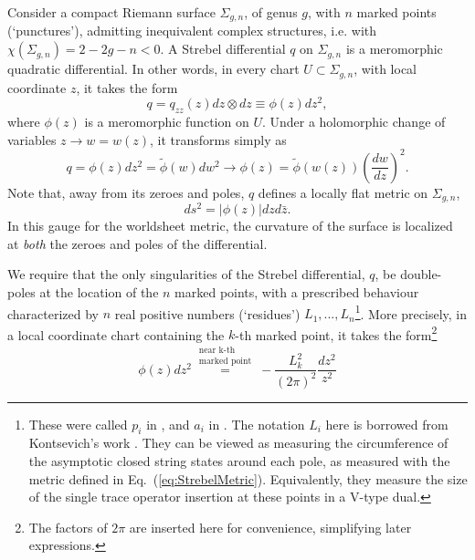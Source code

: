 \documentclass[english]{article}
\let\mc=\mathcal
\begin{document}
Consider a compact Riemann surface $\Sigma_{g,n}$, of genus $g$, with $n$ marked points (`punctures'), admitting inequivalent complex structures, i.e. with $\chi(\Sigma_{g,n})=2-2g-n<0$. 
A Strebel differential $q$ on $\Sigma_{g,n}$ is a meromorphic quadratic differential. In other words, in every chart $U \subset \Sigma_{g,n}$, with local coordinate $z$, it takes the form 
\begin{equation}
    q = q_{zz}(z) dz \otimes dz \equiv \phi(z) dz^2 ,
\end{equation}
where $\phi(z)$ is a meromorphic function on $U$. Under a holomorphic change of variables $z \rightarrow w=w(z)$, it transforms simply as 
\begin{equation}
    q = \phi(z) dz^2 = \tilde{\phi}(w) dw^2 \rightarrow  \phi(z) = \tilde{\phi}(w(z)) \left(\frac{dw}{dz} \right)^2 .
\end{equation}
Note that, away from its zeroes and poles, $q$ defines a locally flat metric on $\Sigma_{g,n}$,
\begin{equation} \label{eq:StrebelMetric}
    ds^2 = | \phi(z) | dz d\bar{z} .
\end{equation}
In this gauge for the worldsheet metric, the curvature of the surface is localized at \textit{both} the zeroes and poles of the  differential.  

We require that the only singularities of the Strebel differential, $q$, be double-poles at the location of the $n$  marked points, with a prescribed behaviour characterized by $n$ real positive numbers (`residues') $L_1,...,L_n$\footnote{These were called $p_i$ in \cite{freefieldsIII}, and $a_i$ in \cite{mulaseStrebel}. The notation $L_i$ here is borrowed from Kontsevich's work \cite{KontsevichAiry}. They can be viewed as measuring the circumference of the asymptotic closed string states around each pole, as measured with the metric defined in Eq.~(\ref{eq:StrebelMetric}). Equivalently, they measure the size of the single trace operator insertion at these points in a V-type dual.}. More precisely, in a local coordinate chart containing the $k$-th marked point, it takes the form\footnote{The factors of $2\pi$ are inserted here for convenience, simplifying later expressions. } 
\begin{equation}
    \phi(z) dz^2  \overset{\substack{\text{near k-th}\\ \text{marked point}}}{=} - \frac{L_k^2}{(2\pi)^2} \frac{dz^2}{z^2}
\end{equation}
\end{document}

